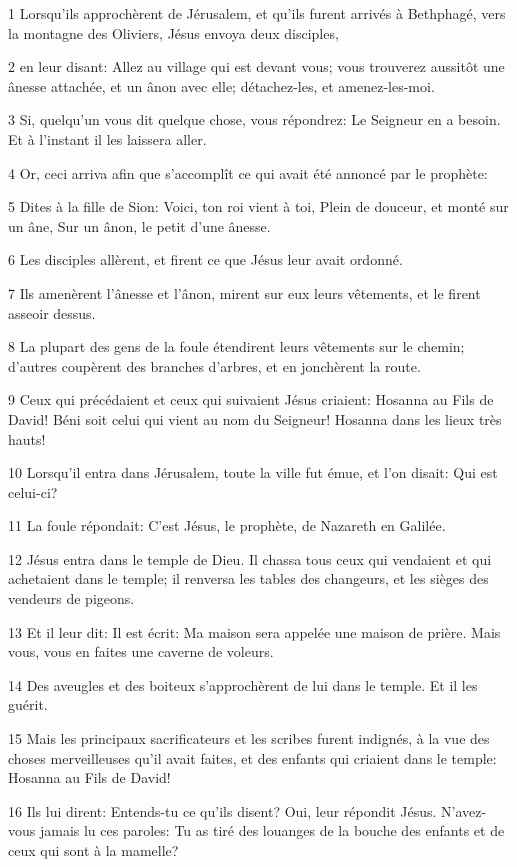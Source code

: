 \par 1 Lorsqu'ils approchèrent de Jérusalem, et qu'ils furent arrivés à Bethphagé, vers la montagne des Oliviers, Jésus envoya deux disciples,
\par 2 en leur disant: Allez au village qui est devant vous; vous trouverez aussitôt une ânesse attachée, et un ânon avec elle; détachez-les, et amenez-les-moi.
\par 3 Si, quelqu'un vous dit quelque chose, vous répondrez: Le Seigneur en a besoin. Et à l'instant il les laissera aller.
\par 4 Or, ceci arriva afin que s'accomplît ce qui avait été annoncé par le prophète:
\par 5 Dites à la fille de Sion: Voici, ton roi vient à toi, Plein de douceur, et monté sur un âne, Sur un ânon, le petit d'une ânesse.
\par 6 Les disciples allèrent, et firent ce que Jésus leur avait ordonné.
\par 7 Ils amenèrent l'ânesse et l'ânon, mirent sur eux leurs vêtements, et le firent asseoir dessus.
\par 8 La plupart des gens de la foule étendirent leurs vêtements sur le chemin; d'autres coupèrent des branches d'arbres, et en jonchèrent la route.
\par 9 Ceux qui précédaient et ceux qui suivaient Jésus criaient: Hosanna au Fils de David! Béni soit celui qui vient au nom du Seigneur! Hosanna dans les lieux très hauts!
\par 10 Lorsqu'il entra dans Jérusalem, toute la ville fut émue, et l'on disait: Qui est celui-ci?
\par 11 La foule répondait: C'est Jésus, le prophète, de Nazareth en Galilée.
\par 12 Jésus entra dans le temple de Dieu. Il chassa tous ceux qui vendaient et qui achetaient dans le temple; il renversa les tables des changeurs, et les sièges des vendeurs de pigeons.
\par 13 Et il leur dit: Il est écrit: Ma maison sera appelée une maison de prière. Mais vous, vous en faites une caverne de voleurs.
\par 14 Des aveugles et des boiteux s'approchèrent de lui dans le temple. Et il les guérit.
\par 15 Mais les principaux sacrificateurs et les scribes furent indignés, à la vue des choses merveilleuses qu'il avait faites, et des enfants qui criaient dans le temple: Hosanna au Fils de David!
\par 16 Ils lui dirent: Entends-tu ce qu'ils disent? Oui, leur répondit Jésus. N'avez-vous jamais lu ces paroles: Tu as tiré des louanges de la bouche des enfants et de ceux qui sont à la mamelle?
